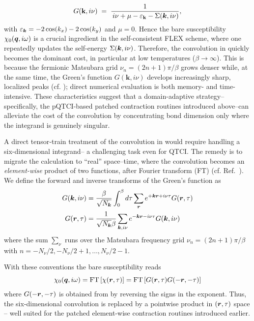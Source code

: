 \begin{equation}
  G(\mathbf{k}, i\nu)
  \;=\;
  \frac{1}
       {\,i\nu+\mu-\varepsilon_{\mathbf{k}}-\Sigma(\boldsymbol{k}, i\nu)},
       \label{eq:greenBubble}
\end{equation}
with $\varepsilon_{\boldsymbol{k}} = -2 \cos (k_x) - 2 \cos (k_y)$ and $\mu=0$. Hence the bare susceptibility $\chi_{0}(\boldsymbol{q}, i\omega)$ is a crucial ingredient in the self-consistent FLEX scheme, where one repeatedly updates the self-energy $\Sigma(\boldsymbol{k}, i\nu)$. Therefore, the convolution in  quickly becomes the dominant cost, in particular at low temperatures ($\beta \to \infty$). This is because the fermionic Matsubara grid \(\nu_n=(2n+1)\pi/\beta\) grows denser while, at the same time, the Green’s function $G(\mathbf{k}, i\nu)$ develops increasingly sharp, localized peaks (cf. ); direct numerical evaluation is both memory- and time-intensive. These characteristics suggest that a domain-adaptive strategy--specifically, the pQTCI-based patched contraction routines introduced above--can alleviate the cost of the convolution by concentrating bond dimension only where the integrand is genuinely singular.

A direct tensor‐train treatment of the convolution in  would require handling a six-dimensional integrand-- a challenging task even for QTCI. The remedy is to migrate the calculation to “real” space–time, where the
convolution becomes an \emph{element-wise} product of two functions, after Fourier transform (FT) (cf. Ref.~\cite{Rakhuba2015}).
We define the forward and inverse transforms of the Green’s function as
\begin{align}
     G(\boldsymbol{k}, i\nu) &=  \frac{\beta}{\sqrt{N_{\boldsymbol{k}}}}\int_{0}^{\beta} d\tau \sum_{\boldsymbol{r}} e^{+\boldsymbol{k}\boldsymbol{r}+i\nu\tau}  G(\boldsymbol{r}, \tau) 
     \label{eq:FTGreensFunc} 
     \\
    G(\boldsymbol{r}, \tau) &= \frac{1}{\sqrt{N_{\boldsymbol{k}}}\beta}\sum_{\boldsymbol{k},i\nu} e^{-\boldsymbol{k}\boldsymbol{r}-i\nu\tau} G(\boldsymbol{k}, i\nu) 
    \label{eq:invFTGreensFunc} 
\end{align}
where the sum $\sum_{\nu}$ runs over the Matsubara frequency grid \(\nu_n=(2n+1)\pi/\beta\) with $n=-N_{\nu}/2, -N_{\nu}/2+1, \dots, N_{\nu}/2-1$. 

With these conventions the bare susceptibility reads
\begin{equation}
    \chi_{0}(\boldsymbol{q}, i\omega) = \text{FT}\left[ \chi(\boldsymbol{r}, \tau) \right] = \text{FT}\left[ G(\boldsymbol{r}, \tau)G(-\boldsymbol{r}, -\tau)\right]
\end{equation}
where  $G(-\boldsymbol{r}, -\tau)$  is obtained from  by reversing the signs in the exponent. Thus, the six-dimensional convolution is replaced by a pointwise product in $(\boldsymbol{r}, \tau)$ space -- well suited for the patched element-wise contraction routines introduced earlier.

